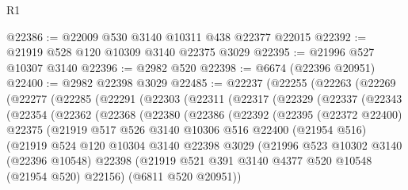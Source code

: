 \begin{lexlean}{R1}
\begin{coremodule}
@22386 := @22009 @530 @3140 @10311 @438 @22377 @22015
@22392 := @21919 @528 @120 @10309 @3140 @22375 @3029
@22395 := @21996 @527 @10307 @3140
@22396 := @2982 @520
@22398 := @6674 (@22396 @20951)
@22400 := @2982 @22398 @3029
@22485 := @22237
    (@22255
      (@22263
        (@22269
          (@22277
            (@22285
              (@22291
                (@22303
                  (@22311
                    (@22317
                      (@22329
                        (@22337
                          (@22343
                            (@22354
                              (@22362
                                (@22368
                                  (@22380
                                    (@22386
                                      (@22392
                                        (@22395
                                          (@22372 @22400)
                                          @22375
                                          (@21919
                                            @517
                                            @526
                                            @3140
                                            @10306
                                            @516
                                            @22400
                                            (@21954 @516)
                                            (@21919
                                              @524
                                              @120
                                              @10304
                                              @3140
                                              @22398
                                              @3029
                                              (@21996
                                                @523
                                                @10302
                                                @3140
                                                (@22396 @10548)
                                                @22398
                                                (@21919
                                                  @521
                                                  @391
                                                  @3140
                                                  @4377
                                                  @520
                                                  @10548
                                                  (@21954 @520)
                                                  @22156)
                                                (@6811 @520 @20951))

\end{coremodule}
\end{lexlean}
